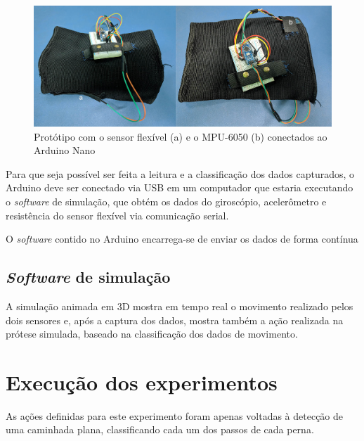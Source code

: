 \begin{figure}[ht]
	\caption{\label{fig:result_prototipo}Protótipo com o sensor flexível (a) e o MPU-6050 (b) conectados ao Arduino Nano}
	\begin{center}
	    \includegraphics[width=.8\textwidth]{resources/result_prototipo}
	\end{center}
\end{figure}

Para que seja possível ser feita a leitura e a classificação dos dados capturados, o Arduino deve ser conectado via USB em um computador que estaria executando o \textit{software} de simulação, que obtém os dados do giroscópio, acelerômetro e resistência do sensor flexível via comunicação serial.

O \textit{software} contido no Arduino encarrega-se de enviar os dados de forma contínua

\subsection{\textit{Software} de simulação}\label{sec:result_simulacao}


A simulação animada em 3D mostra em tempo real o movimento realizado pelos dois sensores e, após a captura dos dados, mostra também a ação realizada na prótese simulada, baseado na classificação dos dados de movimento.

\section{Execução dos experimentos}\label{sec:result_execucao}


As ações definidas para este experimento foram apenas voltadas à detecção de uma caminhada plana, classificando cada um dos passos de cada perna.

